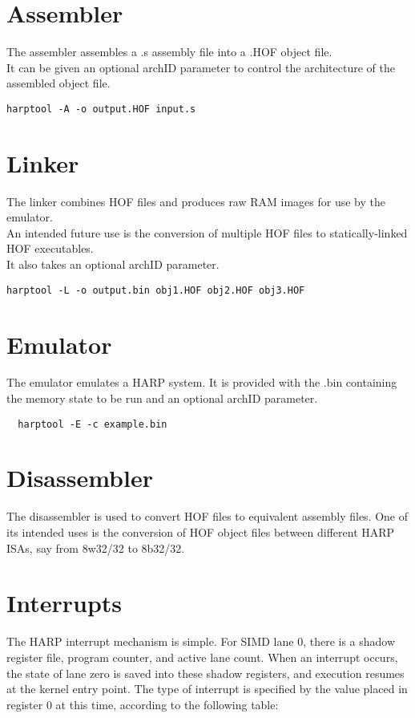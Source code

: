 \documentclass[10pt,letterpaper]{article}
\begin{document}
\section*{Assembler}
The assembler assembles a .s assembly file into a .HOF object file.\\
It can be given an optional archID parameter to control the architecture of the assembled object file.
\begin{verbatim}
harptool -A -o output.HOF input.s
\end{verbatim}

\section*{Linker}
The linker combines HOF files and produces raw RAM images for use by the emulator.\\
An intended future use is the conversion of multiple HOF files to statically-linked HOF executables.\\
It also takes an optional archID parameter.
\begin{verbatim}
harptool -L -o output.bin obj1.HOF obj2.HOF obj3.HOF
\end{verbatim}

\section*{Emulator}
The emulator emulates a HARP system. It is provided with the .bin containing the memory state to be run and an optional archID parameter.
\begin{verbatim}
  harptool -E -c example.bin
\end{verbatim}

\section*{Disassembler}
The disassembler is used to convert HOF files to equivalent assembly files.
One of its intended uses is the conversion of HOF object files between different HARP ISAs, say from 8w32/32 to 8b32/32.


\section{Interrupts}
The HARP interrupt mechanism is simple.
For SIMD lane 0, there is a shadow register file, program counter, and active lane count.
When an interrupt occurs, the state of lane zero is saved into these shadow registers, and execution resumes at the kernel entry point.
The type of interrupt is specified by the value placed in register 0 at this time, according to the following table:
\end{document}
